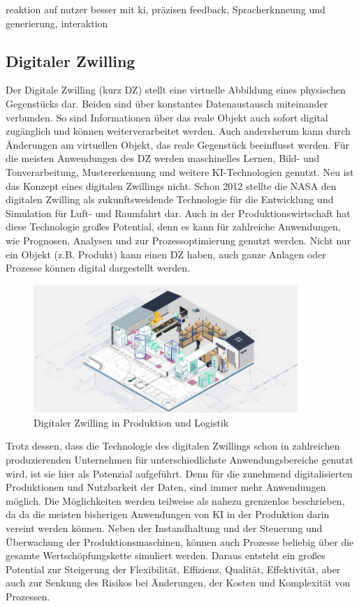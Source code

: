 \documentclass[a4paper,12pt, german]{report}
\begin{document}
reaktion auf nutzer besser mit ki, präzisen feedback, Spracherknneung und generierung, interaktion


\subsection{Digitaler Zwilling}
Der Digitale Zwilling (kurz DZ) stellt eine virtuelle Abbildung eines physischen Gegenstücks dar. Beiden sind über konstantes Datenaustausch miteinander verbunden. So sind Informationen über das reale Objekt auch sofort digital zugänglich und können weiterverarbeitet werden. Auch andersherum kann durch Änderungen am virtuellen Objekt, das reale Gegenstück beeinflusst werden. Für die meisten Anwendungen des DZ werden maschinelles Lernen, Bild- und Tonverarbeitung, Mustererkennung und weitere KI-Technologien genutzt.
Neu ist das Konzept eines digitalen Zwillings nicht. Schon 2012 stellte die NASA den digitalen Zwilling als zukunftsweidende Technologie für die Entwicklung und Simulation für Luft- und Raumfahrt dar. Auch in der Produktionswirtschaft hat diese Technologie großes Potential, denn es kann für zahlreiche Anwendungen, wie Prognosen, Analysen und zur Prozessoptimierung genutzt werden. Nicht nur ein Objekt (z.B. Produkt) kann einen DZ haben, auch ganze Anlagen oder Prozesse können digital dargestellt werden. \cite{32}

\begin{figure}[H]
  \center
 \includegraphics[width=10cm]{images/DZ.png}
  \caption[Digitaler Zwilling in Produktion und Logistik]{Digitaler Zwilling in Produktion und Logistik \cite{34}}
\end{figure}

Trotz dessen, dass die Technologie des digitalen Zwillings schon in zahlreichen produzierenden Unternehmen für unterschiedlichste Anwendungsbereiche genutzt wird, ist sie hier als Potenzial aufgeführt. Denn für die zunehmend digitalisierten Produktionen und Nutzbarkeit der Daten, sind immer mehr Anwendungen möglich. Die Möglichkeiten werden teilweise als nahezu grenzenlos beschrieben, da da die meisten bisherigen Anwendungen von KI in der Produktion darin vereint werden können. Neben der Instandhaltung und der Steuerung und Überwachung der Produktionsmaschinen, können auch Prozesse beliebig über die gesamte Wertschöpfungskette simuliert werden. Daraus entsteht ein großes Potential zur Steigerung der Flexibilität, Effizienz, Qualität, Effektivität, aber auch zur Senkung des Risikos bei Änderungen, der Kosten und Komplexität von Prozessen.\cite{33}
\end{document}
